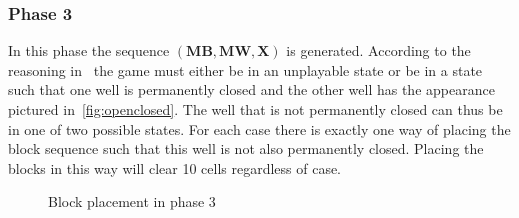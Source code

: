 \subsubsection{Phase 3}

In this phase the sequence $\left( \mathbf{MB}, \mathbf{MW}, \mathbf{X} \right)$ is generated. According to the reasoning in~ the game must either be in an unplayable state or be in a state such that one well is permanently closed and the other well has the appearance pictured in~\autoref{fig:openclosed}. The well that is not permanently closed can thus be in one of two possible states. For each case there is exactly one way of placing the block sequence such that this well is not also permanently closed. Placing the blocks in this way will clear 10 cells regardless of case.

\begin{figure}[H]
    \centering
    \begin{subfigure}[b]{0.8\textwidth}
        \caption{}
         \vspace*{1cm}
    \end{subfigure}

    \begin{subfigure}[b]{0.8\textwidth}
        \caption{}
    \end{subfigure}

    \caption{Block placement in phase 3}
    \label{fig:placement}
\end{figure}

